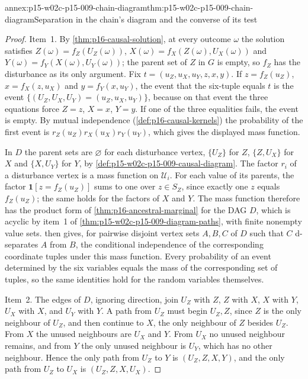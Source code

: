 \begin{annexitem}{annex:p15-w02c-p15-009-chain-diagram}{thm:p15-w02c-p15-009-chain-diagram}{Separation in the chain's diagram and the converse of its test}
\begin{proof}
Item~1. By \cref{thm:p16-causal-solution}, at every outcome \(\omega\)
the solution satisfies \(Z(\omega)=f_Z(U_Z(\omega))\),
\(X(\omega)=f_X(Z(\omega),U_X(\omega))\) and
\(Y(\omega)=f_Y(X(\omega),U_Y(\omega))\); the parent set of \(Z\) in
\(G\) is empty, so \(f_Z\) has the disturbance as its only argument.
Fix \(t=(u_Z,u_X,u_Y,z,x,y)\). If \(z=f_Z(u_Z)\),
\(x=f_X(z,u_X)\) and \(y=f_Y(x,u_Y)\), the event that the six-tuple
equals \(t\) is the event \(\{(U_Z,U_X,U_Y)=(u_Z,u_X,u_Y)\}\), because
on that event the three equations force \(Z=z\), \(X=x\), \(Y=y\). If one
of the three equalities fails, the event is empty. By mutual independence
(\cref{def:p16-causal-kernels}) the probability of the first event is
\(r_Z(u_Z)r_X(u_X)r_Y(u_Y)\), which gives the displayed mass function.

In \(D\) the parent sets are \(\varnothing\) for each disturbance vertex,
\(\{U_Z\}\) for \(Z\), \(\{Z,U_X\}\) for \(X\) and \(\{X,U_Y\}\) for
\(Y\), by \cref{def:p15-w02c-p15-009-causal-diagram}. The factor
\(r_i\) of a disturbance vertex is a mass function on
\(\mathcal U_i\). For each value of its parents, the factor
\(\mathbf 1[z=f_Z(u_Z)]\) sums to one over \(z\in S_Z\), since exactly
one \(z\) equals \(f_Z(u_Z)\); the same holds for the factors of \(X\)
and \(Y\). The mass function therefore has the product form of
\cref{thm:p16-ancestral-marginal} for the DAG \(D\), which is acyclic by
item~1 of \cref{thm:p15-w02c-p15-009-diagram-paths}, with finite
nonempty value sets.  then gives, for
pairwise disjoint vertex sets \(A,B,C\) of \(D\) such that \(C\)
d-separates \(A\) from \(B\), the conditional independence of the
corresponding coordinate tuples under this mass function. Every
probability of an event determined by the six variables equals the mass
of the corresponding set of tuples, so the same identities hold for the
random variables themselves.

Item~2. The edges of \(D\), ignoring direction, join \(U_Z\) with \(Z\),
\(Z\) with \(X\), \(X\) with \(Y\), \(U_X\) with \(X\), and \(U_Y\)
with \(Y\). A path from \(U_Z\) must begin \(U_Z,Z\), since \(Z\) is the
only neighbour of \(U_Z\), and then continue to \(X\), the only
neighbour of \(Z\) besides \(U_Z\). From \(X\) the unused neighbours are
\(U_X\) and \(Y\). From \(U_X\) no unused neighbour remains, and from
\(Y\) the only unused neighbour is \(U_Y\), which has no other
neighbour. Hence the only path from \(U_Z\) to \(Y\) is
\((U_Z,Z,X,Y)\), and the only path from \(U_Z\) to \(U_X\) is
\((U_Z,Z,X,U_X)\).


\end{proof}
\end{annexitem}
